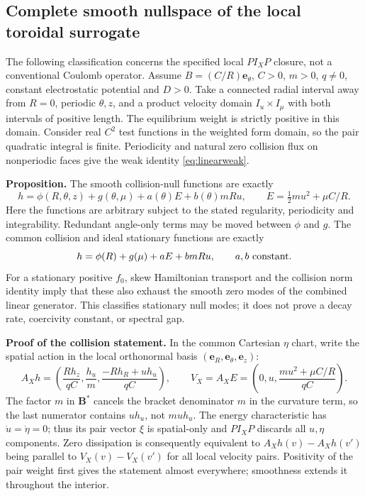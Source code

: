 \documentclass[11pt,letterpaper]{article}
\begin{document}
\subsection*{Complete smooth nullspace of the local toroidal surrogate}

The following classification concerns the specified local $P I_XP$ closure,
not a conventional Coulomb operator. Assume $B=(C/R)\bm e_\theta$, $C>0$,
$m>0$, $q\ne0$, constant electrostatic potential and $D>0$.
Take a connected radial interval away from $R=0$, periodic $\theta,z$, and a
product velocity domain $I_u\times I_\mu$ with both intervals of positive
length. The equilibrium weight is strictly positive in this domain.
Consider real $C^2$ test functions in the weighted form domain, so the pair
quadratic integral is finite. Periodicity and natural zero collision flux on
nonperiodic faces give the weak identity \eqref{eq:linearweak}.

\textbf{Proposition.} The smooth collision-null functions are exactly
\begin{equation}
 h=\phi(R,\theta,z)+g(\theta,\mu)
   +a(\theta)E+b(\theta)mRu,
 \qquad E=\tfrac12mu^2+\mu C/R.
 \label{eq:toroidalnullspace}
\end{equation}
Here the functions are arbitrary subject to the stated regularity,
periodicity and integrability. Redundant angle-only terms may be moved between
$\phi$ and $g$. The common collision and ideal stationary functions are exactly
\begin{equation}
 h=\phi(R)+g(\mu)+aE+b mRu,
 \qquad a,b\ \hbox{constant}.
 \label{eq:toroidalcommonnull}
\end{equation}
For a stationary positive $f_0$, skew Hamiltonian transport and the collision
norm identity imply that these also exhaust the smooth zero modes of the
combined linear generator. This classifies stationary null modes; it does not
prove a decay rate, coercivity constant, or spectral gap.

\textbf{Proof of the collision statement.} In the common Cartesian $\eta$ chart,
write the spatial action in the local orthonormal basis
$(\bm e_R,\bm e_\theta,\bm e_z)$:
\begin{equation}
 A_Xh=\left(\frac{R h_z}{qC},\frac{h_u}{m},
                 \frac{-R h_R+u h_u}{qC}\right),\qquad
 V_X=A_XE=\left(0,u,\frac{m u^2+\mu C/R}{qC}\right).
 \label{eq:toroidalaction}
\end{equation}
The factor $m$ in $\bm B^*$ cancels the bracket denominator $m$ in the
curvature term, so the last numerator contains $u h_u$, not $m u h_u$.
The energy characteristic has $\dot u=\dot\eta=0$; thus its pair vector
$\xi$ is spatial-only and $P I_XP$ discards all $u,\eta$ components.
Zero dissipation is consequently equivalent to
$A_Xh(v)-A_Xh(v')$ being parallel to $V_X(v)-V_X(v')$ for all local velocity
pairs. Positivity of the pair weight first gives the statement almost
everywhere; smoothness extends it throughout the interior.
\end{document}
